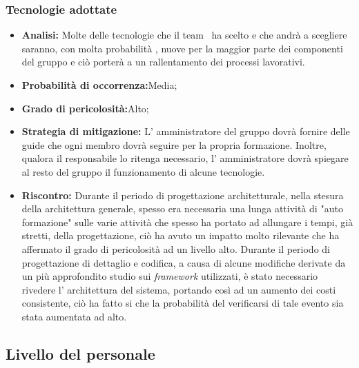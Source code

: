 \subsubsection{Tecnologie adottate}
	\begin{itemize}
	\item \textbf{Analisi: }Molte delle tecnologie che il team \gruppo ~ha scelto e che andrà a scegliere saranno, con molta probabilità , nuove per la maggior parte dei componenti del gruppo e ciò porterà a un rallentamento dei processi lavorativi.
	\item \textbf{Probabilità di occorrenza:}Media;
	\item \textbf{Grado di pericolosità:}Alto;
	\item \textbf{Strategia di mitigazione: }L' amministratore del gruppo dovrà fornire delle guide che ogni membro dovrà seguire per la propria formazione. Inoltre, qualora il responsabile lo ritenga necessario, l' amministratore dovrà spiegare al resto del gruppo il funzionamento di alcune tecnologie.
	\item \textbf{Riscontro:} Durante il periodo di progettazione architetturale, nella stesura della architettura generale, spesso era necessaria una lunga attività di "auto formazione" sulle varie attività che spesso ha portato ad allungare i tempi, già stretti, della progettazione, ciò ha avuto un impatto molto rilevante che ha affermato il grado di pericolosità ad un livello alto. Durante il periodo di progettazione di dettaglio e codifica, a causa di alcune modifiche derivate da un più approfondito studio sui \textit{framework} utilizzati, è stato necessario rivedere l' architettura del sistema, portando così ad un aumento dei costi consistente, ciò ha fatto si che la probabilità del verificarsi di tale evento sia stata aumentata ad alto.
	\end{itemize}
\subsection{Livello del personale}
